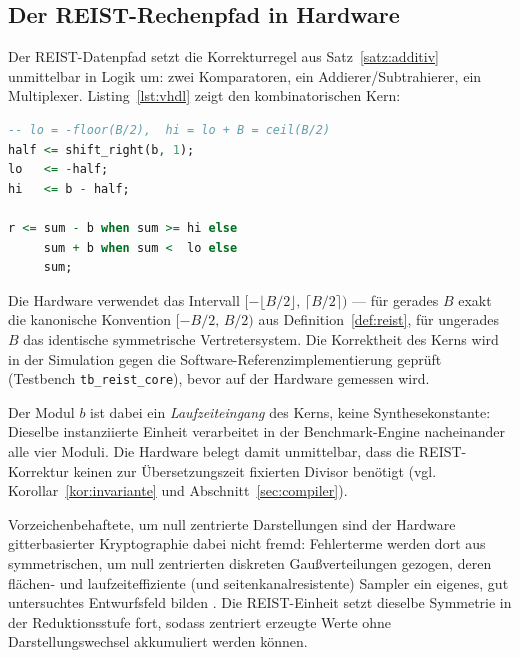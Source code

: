 \documentclass[11pt,a4paper]{scrartcl}
\theoremstyle{definition}
\theoremstyle{plain}
\theoremstyle{remark}
\begin{document}
\subsection{Der REIST-Rechenpfad in Hardware}

Der REIST-Datenpfad setzt die Korrekturregel aus Satz~\ref{satz:additiv} unmittelbar in Logik um: zwei Komparatoren, ein Addierer/Subtrahierer, ein Multiplexer. Listing~\ref{lst:vhdl} zeigt den kombinatorischen Kern:

\noindent\begin{minipage}{\linewidth}
\begin{lstlisting}[language=VHDL, caption={Der kombinatorische REIST-Korrekturschritt (\texttt{reist\_core.vhd}, gekürzt). Ein Guard-Bit ($W$ downto $0$) stellt sicher, dass weder $acc+x$ noch die $\pm B$-Korrektur überlaufen. Die floor/ceil-Aufteilung behandelt gerade und ungerade Moduli einheitlich.},label={lst:vhdl}]
-- lo = -floor(B/2),  hi = lo + B = ceil(B/2)
half <= shift_right(b, 1);
lo   <= -half;
hi   <= b - half;

r <= sum - b when sum >= hi else
     sum + b when sum <  lo else
     sum;
\end{lstlisting}
\end{minipage}

Die Hardware verwendet das Intervall $[-\lfloor B/2 \rfloor,\, \lceil B/2 \rceil)$ --- für gerades $B$ exakt die kanonische Konvention $[-B/2,\, B/2)$ aus Definition~\ref{def:reist}, für ungerades $B$ das identische symmetrische Vertretersystem. Die Korrektheit des Kerns wird in der Simulation gegen die Software-Referenzimplementierung geprüft (Testbench \texttt{tb\_reist\_core}), bevor auf der Hardware gemessen wird.

Der Modul $b$ ist dabei ein \emph{Laufzeiteingang} des Kerns, keine Synthesekonstante: Dieselbe instanziierte Einheit verarbeitet in der Benchmark-Engine nacheinander alle vier Moduli. Die Hardware belegt damit unmittelbar, dass die REIST-Korrektur keinen zur Übersetzungszeit fixierten Divisor benötigt (vgl. Korollar~\ref{kor:invariante} und Abschnitt~\ref{sec:compiler}).

Vorzeichenbehaftete, um null zentrierte Darstellungen sind der Hardware gitterbasierter Kryptographie dabei nicht fremd: Fehlerterme werden dort aus symmetrischen, um null zentrierten diskreten Gaußverteilungen gezogen, deren flächen- und laufzeiteffiziente (und seitenkanalresistente) Sampler ein eigenes, gut untersuchtes Entwurfsfeld bilden \cite{howe2016tc,khalid2018}. Die REIST-Einheit setzt dieselbe Symmetrie in der Reduktionsstufe fort, sodass zentriert erzeugte Werte ohne Darstellungswechsel akkumuliert werden können.
\end{document}
